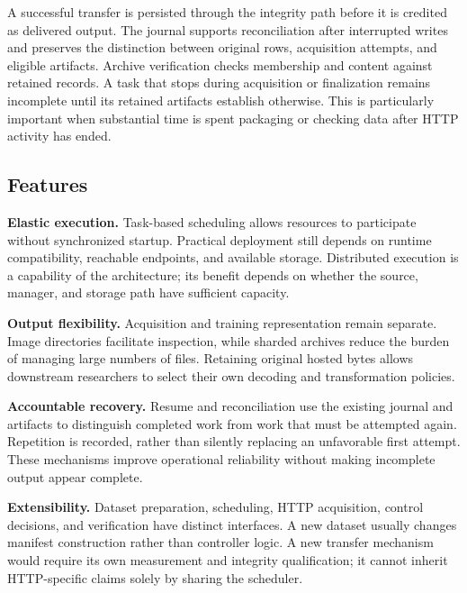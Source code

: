 A successful transfer is persisted through the integrity path before it is credited as delivered output. The journal supports reconciliation after interrupted writes and preserves the distinction between original rows, acquisition attempts, and eligible artifacts. Archive verification checks membership and content against retained records. A task that stops during acquisition or finalization remains incomplete until its retained artifacts establish otherwise. This is particularly important when substantial time is spent packaging or checking data after HTTP activity has ended.

\subsection{Features}
\textbf{Elastic execution.} Task-based scheduling allows resources to participate without synchronized startup. Practical deployment still depends on runtime compatibility, reachable endpoints, and available storage. Distributed execution is a capability of the architecture; its benefit depends on whether the source, manager, and storage path have sufficient capacity.

\textbf{Output flexibility.} Acquisition and training representation remain separate. Image directories facilitate inspection, while sharded archives reduce the burden of managing large numbers of files. Retaining original hosted bytes allows downstream researchers to select their own decoding and transformation policies.

\textbf{Accountable recovery.} Resume and reconciliation use the existing journal and artifacts to distinguish completed work from work that must be attempted again. Repetition is recorded, rather than silently replacing an unfavorable first attempt. These mechanisms improve operational reliability without making incomplete output appear complete.

\textbf{Extensibility.} Dataset preparation, scheduling, HTTP acquisition, control decisions, and verification have distinct interfaces. A new dataset usually changes manifest construction rather than controller logic. A new transfer mechanism would require its own measurement and integrity qualification; it cannot inherit HTTP-specific claims solely by sharing the scheduler.
